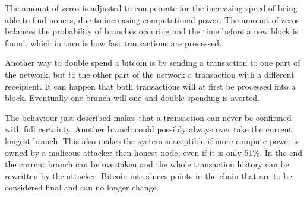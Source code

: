 The amount of zeros is adjusted to compensate for the increasing speed of being able to find nonces, due to increasing computational power.
The amount of zeros balances the probability of branches occuring
and the time before a new block is found,
which in turn is how fast transactions are processed.

Another way to double spend a bitcoin is by sending a transaction to one part of the network,
but to the other part of the network a transaction with a different receipient.
It can happen that both transactions will at first be processed into a block.
Eventually one branch will one and double spending is averted.

The behaviour just described makes that a transaction can never be confirmed with full certainty.
Another branch could possibly always over take the current longest branch.
This also makes the system susceptible if more compute power is owned by a malicous attacker then honest node, even if it is only 51\%. 
In the end the current branch can be overtaken
and the whole transaction history can be rewritten by the attacker.
Bitcoin introduces points in the chain that are to be considered final and can no longer change.
